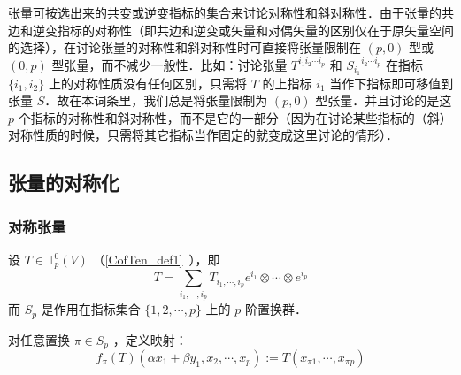 张量可按选出来的共变或逆变指标的集合来讨论对称性和斜对称性．由于张量的共边和逆变指标的对称性（即共边和逆变或矢量和对偶矢量的区别仅在于原矢量空间的选择），在讨论张量的对称性和斜对称性时可直接将张量限制在 $(p,0)$ 型或 $(0,p)$ 型张量，而不减少一般性．比如：讨论张量 $T^{i_1 i_2\cdots i_p}$ 和 ${S_{i_1}}^{i_2\cdots i_p}$ 在指标 $\{i_1,i_2\}$ 上的对称性质没有任何区别，只需将 $T$ 的上指标 $i_1$ 当作下指标即可移值到张量 $S$．故在本词条里，我们总是将张量限制为 $(p,0)$ 型张量．并且讨论的是这 $p$ 个指标的对称性和斜对称性，而不是它的一部分（因为在讨论某些指标的（斜）对称性质的时候，只需将其它指标当作固定的就变成这里讨论的情形）．
\subsection{张量的对称化}
\subsubsection{对称张量}
设 $T\in \mathbb{T}_p^0(V)$ （\autoref{CofTen_def1}~），即
\begin{equation}
T=\sum_{i_1,\cdots,i_p}T_{i_1,\cdots,i_p}e^{i_1}\otimes\cdots\otimes e^{i_p}
\end{equation}
而 $S_p$ 是作用在指标集合 $\{1,2,\cdots,p\}$ 上的 $p$ 阶置换群．

对任意置换 $\pi\in S_p$ ，定义映射：
\begin{equation}
f_\pi(T)(\alpha x_1+\beta y_1,x_2,\cdots,x_p):=T(x_{\pi1},\cdots,x_{\pi p})
\end{equation}


